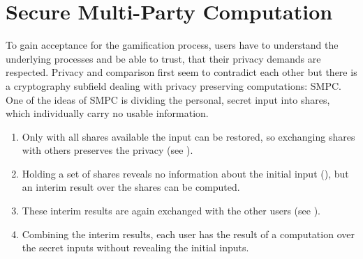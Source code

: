 \section{Secure Multi-Party Computation} \label{Introduction: Secure Multi-Party Computation}
To gain acceptance for the gamification process, users have to understand the underlying processes and be able to trust, that their privacy demands are respected. Privacy and comparison first seem to contradict each other but there is a cryptography subfield dealing with privacy preserving computations: \gls{SMPC}.
One of the ideas of \gls{SMPC} is dividing the personal, secret input into shares, which individually carry no usable information.
\begin{enumerate}
	\item Only with all shares available the input can be restored, so exchanging shares with others preserves the privacy (see ). 
	\item Holding a set of shares reveals no information about the initial input (), but an interim result over the shares can be computed.
	\item  These interim results are again exchanged with the other users (see ). 
	\item Combining the interim results, each user has the result of a computation over the secret inputs without revealing the initial inputs.
\end{enumerate}



